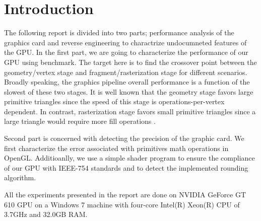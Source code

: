 \section{Introduction}
The following report is divided into two parts; performance analysis of the graphics card and reverse engineering to charactrize undocumneted features of the GPU. In the first part, we are going to characterize the performance of our GPU using \protect{\wes} benchmark. The target here is to find the crossover point between the geometry/vertex stage and fragment/rasterization stage for different scenarios. Broadly speaking, the graphics pipeline overall performance is a function of the slowest of these two stages. It is well known that the geometry stage favors large primitive triangles since the speed of this stage is operations-per-vertex dependent. In contrast, rasterization stage favors small primitive triangles since a large triangle would require more fill operations \cite{Bethel_2010}.

Second part is concerned with detecting the precision of the graphic card. We first characterize the error associated with primitives math operations in OpenGL. Additioanlly, we use a simple shader program to ensure the compliance of our GPU with IEEE-754 standards and to detect the  implemented rounding algorithm. 

All the experiments presented in the report are done on NVIDIA GeForce GT 610 GPU on a Windows 7 machine with four-core Intel(R) Xeon(R) CPU of 3.7GHz and 32.0GB RAM. 

